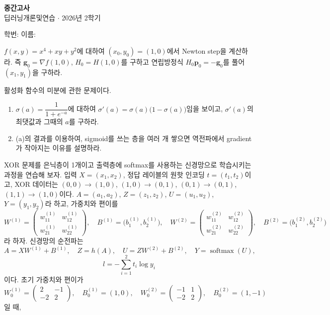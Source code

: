 \documentclass[11pt,a4paper]{article}
\newcommand{\sigmoid}{\sigma}
\newcommand{\softmax}{\operatorname{softmax}}
\begin{document}

\begin{center}
{\LARGE\bfseries 중간고사}\\[0.35em]
{\large 딥러닝개론및연습 $\cdot$ 2026년 2학기}\\[0.6em]
\end{center}

\begin{flushright}
학번: \underline{\hspace{4cm}}\qquad 이름: \underline{\hspace{3.5cm}}
\end{flushright}

\begin{problems}



\item $f(x,y)=x^4+xy+y^2$에 대하여 $(x_0,y_0)=(1,0)$에서 Newton step을 계산하라.
즉 $\bm g_0=\nabla f(1,0)$, $H_0=H(1,0)$를 구하고 연립방정식 $H_0\bm p_0=-\bm g_0$를 풀어 $(x_1,y_1)$을 구하라.

\item 활성화 함수의 미분에 관한 문제이다.
\begin{enumerate}[label=(\alph*),leftmargin=2em]
\item $\sigmoid(a)=\dfrac{1}{1+e^{-a}}$에 대하여 $\sigmoid'(a)=\sigmoid(a)\bigl(1-\sigmoid(a)\bigr)$임을 보이고,
$\sigmoid'(a)$의 최댓값과 그때의 $a$를 구하라.
\item (a)의 결과를 이용하여, sigmoid를 쓰는 층을 여러 개 쌓으면 역전파에서 gradient가 작아지는 이유를 설명하라.
\end{enumerate}

\item

XOR 문제를 은닉층이 1개이고 출력층에 softmax를 사용하는 신경망으로 학습시키는 과정을 연습해 보자.
입력 $X=(x_1,x_2)$, 정답 레이블의 원핫 인코딩 $t=(t_1,t_2)$이고, XOR 데이터는
$(0,0)\to(1,0)$, $(1,0)\to(0,1)$, $(0,1)\to(0,1)$, $(1,1)\to(1,0)$이다.
$A=(a_1,a_2)$, $Z=(z_1,z_2)$, $U=(u_1,u_2)$, $Y=(y_1,y_2)$라 하고, 가중치와 편이를
\[
W^{(1)}=\begin{pmatrix}w^{(1)}_{11}&w^{(1)}_{12}\\ w^{(1)}_{21}&w^{(1)}_{22}\end{pmatrix},\quad
B^{(1)}=\bigl(b^{(1)}_1,b^{(1)}_2\bigr),\quad
W^{(2)}=\begin{pmatrix}w^{(2)}_{11}&w^{(2)}_{12}\\ w^{(2)}_{21}&w^{(2)}_{22}\end{pmatrix},\quad
B^{(2)}=\bigl(b^{(2)}_1,b^{(2)}_2\bigr)
\]
라 하자. 신경망의 순전파는
\[
A=XW^{(1)}+B^{(1)},\quad Z=h(A),\quad U=ZW^{(2)}+B^{(2)},\quad Y=\softmax(U),
\]
\[
l=-\sum_{i=1}^{2}t_i\log y_i
\]
이다. 초기 가중치와 편이가
\[
W^{(1)}_0=\begin{pmatrix}2&-1\\-2&2\end{pmatrix},\quad
B^{(1)}_0=(1,0),\quad
W^{(2)}_0=\begin{pmatrix}-1&1\\-2&2\end{pmatrix},\quad
B^{(2)}_0=(1,-1)
\]
일 때,


\end{problems}
\end{document}
